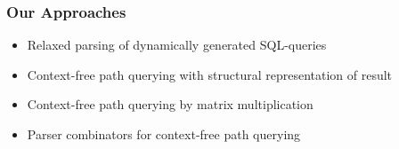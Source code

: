 \documentclass[xcolor=table]{beamer}
\begin{document}
\begin{frame}
  \transwipe[direction=90]
  \frametitle{Our Approaches}
  \begin{itemize}
    \item Relaxed parsing of dynamically generated SQL-queries %
    \item Context-free path querying with structural representation of result %
    \item Context-free path querying by matrix multiplication %
    \item Parser combinators for context-free path querying %
  \end{itemize}
\end{frame}
\end{document}
